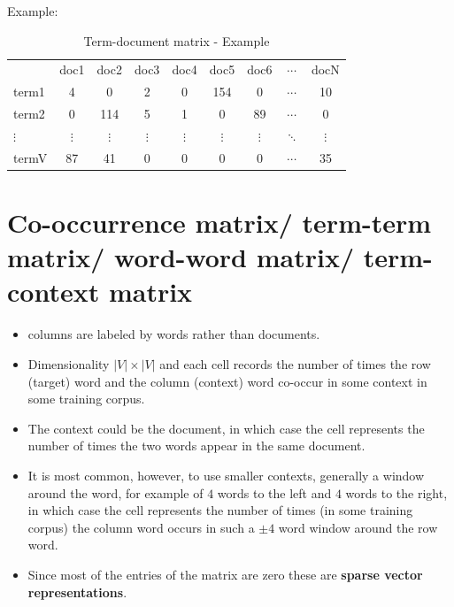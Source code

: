 Example:
\begin{table}[h]
    \centering
    \begin{tabular}{l c c c c c c c c}
         & doc1 & doc2 & doc3 & doc4 & doc5 & doc6 & $\cdots$ & docN \\
        term1 & 4 & 0 & 2 & 0 & 154 & 0 & $\cdots$ & 10 \\ 
        term2 & 0 & 114 & 5 & 1 & 0 & 89 & $\cdots$ & 0 \\ 
        $\vdots$ & $\vdots$ & $\vdots$ & $\vdots$ & $\vdots$ & $\vdots$ & $\vdots$ & $\ddots$ & $\vdots$ \\
        termV & 87 & 41 & 0 & 0 & 0 & 0 & $\cdots$ & 35 \\ 
    \end{tabular}
    \caption{Term-document matrix - Example}
\end{table}


\section{Co-occurrence matrix/ term-term matrix/ word-word matrix/ term-context matrix \cite{nlp-1}}\label{Co-occurrence matrix/ term-term matrix/ word-word matrix/ term-context matrix}

\begin{itemize}
    \item columns are labeled by words rather than documents. 
    
    \item Dimensionality $|V|\times|V|$ and each cell records the number of times the row (target) word and the column (context) word co-occur in some context in some training corpus.

    \item The context could be the document, in which case the cell represents the number of times the two words appear in the same document.

    \item It is most common, however, to use smaller contexts, generally a window around the word, for example of $4$ words to the left and $4$ words to the right, in which case the cell represents the number of times (in some training corpus) the column word occurs in such a $\pm 4$ word window around the row word.

    \item Since most of the entries of the matrix are zero these are \textbf{sparse vector representations}.
\end{itemize}


